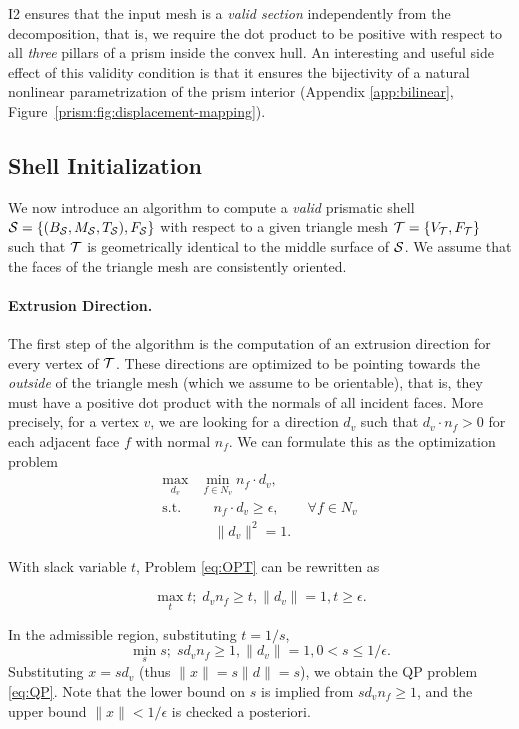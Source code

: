 I2 ensures that the input mesh is a \emph{valid section} independently from the decomposition, that is, we require the dot product to be positive with respect to all \emph{three} pillars of a prism inside the convex hull. An interesting and useful side effect of this validity condition is that it ensures the bijectivity of a natural nonlinear parametrization of the prism interior (Appendix \ref{app:bilinear}, Figure~\ref{prism:fig:displacement-mapping}).

\subsection{Shell Initialization}
\label{prism:sec:initialization}

We now introduce an algorithm to compute a \emph{valid} prismatic shell $\S = \{(B_\S,M_\S,T_\S),F_\S\}$ with respect to a given triangle mesh $\T = \{V_\T,F_\T\}$ such that $\T$ is geometrically identical to the middle surface of $\S$.  We assume that the faces of the triangle mesh are consistently oriented.

\paragraph{Extrusion Direction.} The first step of the algorithm is the computation of an extrusion direction for every vertex of $\T$. These directions are optimized to be pointing towards the \emph{outside} of the triangle mesh (which we assume to be orientable), that is,
they must have a positive dot product with the normals of all incident faces. More precisely, for a vertex $v$, we are looking for a direction $d_v$ such that $d_v \cdot n_f > 0$ for each adjacent face $f$ with normal $n_f$. We can formulate this as the optimization problem
\begin{equation}
\label{eq:OPT}
\begin{split}
    \max_{d_v}& \min_{f \in N_v} n_f \cdot d_v,\\
    \text{s.t. }&\quad n_f \cdot d_v \geq {\epsilon}, \qquad \forall f \in N_v\\
               &\quad  \|d_v\|^2 = 1.
\end{split}
\end{equation}

With slack variable $t$, Problem \ref{eq:OPT} can be rewritten as

$$\max_t t;\; d_v n_f \geq t, \|d_v\| = 1, t \geq {\epsilon}.$$

In the admissible region, substituting 
$t = 1/s$, 
$$\min_s s;\; s d_v n_f \geq 1, \|d_v\| = 1, {0< s \leq 1/\epsilon}.$$
Substituting $x=s d_v$ (thus $\|x\| = s\|d\| = s$), we obtain the QP problem \ref{eq:QP}. Note that the lower bound on $s$ is implied from $s d_v n_f \geq 1$, and the upper bound $\|x\| < 1/\epsilon$ is checked a posteriori.

